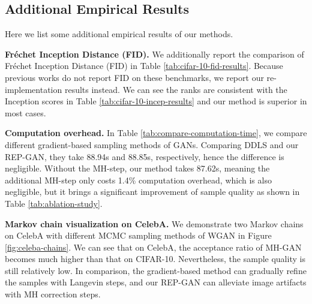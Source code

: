 \documentclass{article} %
\newcommand{\<}{\left\langle}
\renewcommand{\>}{\right\rangle}
\begin{document}
\subsection{Additional Empirical Results}
Here we list some additional empirical results of our methods.

\textbf{Fréchet Inception Distance (FID).} We additionally report the comparison of Fréchet Inception Distance (FID) in Table \ref{tab:cifar-10-fid-results}. Because previous works do not report FID on these benchmarks, we report our re-implementation results instead. We can see the ranks are consistent with the Inception scores in Table \ref{tab:cifar-10-incep-results} and our method is superior in most cases.

\textbf{Computation overhead.} In Table \ref{tab:compare-computation-time}, we compare different gradient-based sampling methods of GANs. Comparing DDLS and our REP-GAN, they take 88.94s and 88.85s, respectively, hence the difference is negligible. Without the MH-step, our method takes 87.62s, meaning the additional MH-step only costs 1.4\% computation overhead, which is also negligible, but it brings a significant improvement of sample quality as shown in Table \ref{tab:ablation-study}. 

\textbf{Markov chain visualization on CelebA.} We demonstrate two Markov chains on CelebA with different MCMC sampling methods of WGAN in Figure \ref{fig:celeba-chains}. We can see that on CelebA, the acceptance ratio of MH-GAN becomes much higher than that on CIFAR-10. Nevertheless, the sample quality is still relatively low. In comparison, the gradient-based method can gradually refine the samples with Langevin steps, and our REP-GAN can alleviate image artifacts with MH correction steps.
\end{document}
